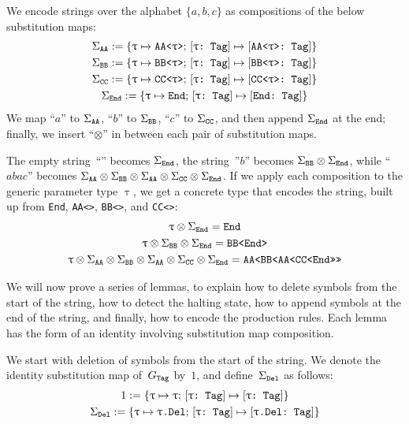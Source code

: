 \documentclass[../generics]{subfiles}
\begin{document}
\begin{definition}
We encode strings over the alphabet $\{a,b,c\}$ as compositions of the below substitution maps:
\begin{gather*}
\Sigma_{\texttt{AA}} := \{\texttt{$\uptau$} \mapsto \texttt{AA<$\uptau$>};\,[\texttt{$\uptau$:~Tag}] \mapsto [\texttt{AA<$\uptau$>:~Tag}]\}\\
\Sigma_{\texttt{BB}} := \{\texttt{$\uptau$} \mapsto \texttt{BB<$\uptau$>};\,[\texttt{$\uptau$:~Tag}] \mapsto [\texttt{BB<$\uptau$>:~Tag}]\}\\
\Sigma_{\texttt{CC}} := \{\texttt{$\uptau$} \mapsto \texttt{CC<$\uptau$>};\,[\texttt{$\uptau$:~Tag}] \mapsto [\texttt{CC<$\uptau$>:~Tag}]\}\\
\Sigma_{\texttt{End}} := \{\texttt{$\uptau$} \mapsto \texttt{End};\,[\texttt{$\uptau$:~Tag}] \mapsto [\texttt{End:~Tag}]\}
\end{gather*}
We map ``$a$'' to $\Sigma_{\texttt{AA}}$, ``$b$'' to $\Sigma_{\texttt{BB}}$, ``$c$'' to $\Sigma_{\texttt{CC}}$, and then append $\Sigma_{\texttt{End}}$ at the end; finally, we insert ``$\otimes$'' in between each pair of substitution maps.
\end{definition}

\begin{example}
The empty string~``'' becomes $\Sigma_{\texttt{End}}$, the string~''$b$'' becomes $\Sigma_{\texttt{BB}}\otimes\Sigma_{\texttt{End}}$, while ``$abac$'' becomes $\Sigma_{\texttt{AA}}\otimes\Sigma_{\texttt{BB}}\otimes\Sigma_{\texttt{AA}}\otimes\Sigma_{\texttt{CC}}\otimes\Sigma_{\texttt{End}}$.
If we apply each composition to the generic parameter type $\uptau$, we get a concrete type that encodes the string, built up from \texttt{End}, \texttt{AA<>}, \texttt{BB<>}, and \texttt{CC<>}:
\begin{gather*}
\uptau\otimes\Sigma_{\texttt{End}} = \texttt{End}\\
\uptau\otimes\Sigma_{\texttt{BB}}\otimes\Sigma_{\texttt{End}} = \texttt{BB<End>}\\
\uptau\otimes\Sigma_{\texttt{AA}}\otimes\Sigma_{\texttt{BB}}\otimes\Sigma_{\texttt{AA}}\otimes\Sigma_{\texttt{CC}}\otimes\Sigma_{\texttt{End}} = \texttt{AA<BB<AA<CC<End>>>>}
\end{gather*}
\end{example}

We will now prove a series of lemmas, to explain how to delete symbols from the start of the string, how to detect the halting state, how to append symbols at the end of the string, and finally, how to encode the production rules. Each lemma has the form of an identity involving substitution map composition.

We start with deletion of symbols from the start of the string. We denote the identity substitution map of~$G_\texttt{Tag}$ by~$1$, and define~$\Sigma_{\texttt{Del}}$ as follows:
\begin{gather*}
1 := \{\texttt{$\uptau$} \mapsto \texttt{$\uptau$};\,[\texttt{$\uptau$:~Tag}] \mapsto [\texttt{$\uptau$:~Tag}]\}\\
\Sigma_{\texttt{Del}} := \{\texttt{$\uptau$} \mapsto \texttt{$\uptau$.Del};\,[\texttt{$\uptau$:~Tag}] \mapsto [\texttt{$\uptau$.Del:~Tag}]\}
\end{gather*}
\end{document}
